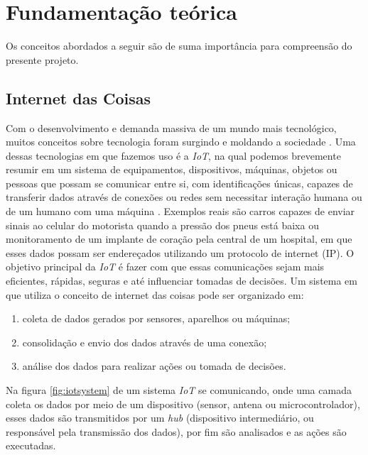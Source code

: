 \documentclass[../../layout.tex]{subfiles}
\begin{document}
\chapter{Fundamentação teórica}

\hspace*{3em}Os conceitos abordados a seguir são de suma importância para compreensão do presente projeto.

\section{Internet das Coisas}
\hspace*{3em}Com o desenvolvimento e demanda massiva de um mundo mais tecnológico, muitos conceitos sobre tecnologia foram surgindo e moldando a sociedade . Uma dessas tecnologias em que fazemos uso é a \emph{IoT}, na qual podemos brevemente resumir em um sistema de equipamentos, dispositivos, máquinas, objetos ou pessoas que possam se comunicar entre si, com identificações únicas, capazes de transferir dados através de conexões ou redes sem necessitar interação humana ou de um humano com uma máquina \cite{iot}. Exemplos reais são carros capazes de enviar sinais ao celular do motorista quando a pressão dos pneus está baixa ou monitoramento de um implante de coração pela central de um hospital, em que esses dados possam ser endereçados utilizando um protocolo de internet (IP). O objetivo principal da \emph{IoT} é fazer com que essas comunicações sejam mais eficientes, rápidas, seguras e até influenciar tomadas de decisões. Um sistema em que utiliza o conceito de internet das coisas pode ser organizado em:

\begin{enumerate}[label=\alph*)]
\itemsep0em
\item coleta de dados gerados por sensores, aparelhos ou máquinas;
\item consolidação e envio dos dados através de uma conexão;
\item análise dos dados para realizar ações ou tomada de decisões.
\end{enumerate}

\hspace*{3em} Na figura \ref{fig:iotsystem} de um sistema \emph{IoT} se comunicando, onde uma camada coleta os dados por meio de um dispositivo (sensor, antena ou microcontrolador), esses dados são transmitidos por um \emph{hub} (dispositivo intermediário, ou responsável pela transmissão dos dados), por fim são analisados e as ações são executadas.
\end{document}
